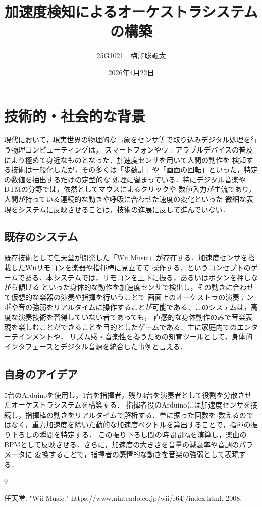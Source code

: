 \documentclass[uplatex,dvipdfmx]{jsarticle}
\begin{document}
\title{加速度検知によるオーケストラシステムの構築}
\author{25G1021　梅澤聡颯太}
\date{2026年4月22日}
\maketitle
\section{技術的・社会的な背景}

現代において，現実世界の物理的な事象をセンサ等で取り込みデジタル処理を行う物理コンピューティングは，
スマートフォンやウェアラブルデバイスの普及により極めて身近なものとなった．加速度センサを用いて人間の動作を
検知する技術は一般化したが，その多くは「歩数計」や「画面の回転」といった，特定の数値を抽出するだけの定型的な
処理に留まっている．特にデジタル音楽やDTMの分野では，依然としてマウスによるクリックや
数値入力が主流であり，人間が持っている連続的な動きや呼吸に合わせた速度の変化といった
微細な表現をシステムに反映させることは，技術の進展に反して進んでいない．

\subsection{既存のシステム}

既存技術として任天堂が開発した「Wii Music」が存在する．加速度センサを搭載したWiiリモコンを楽器や指揮棒に見立てて
操作する，というコンセプトのゲームである\cite{ref:wii}．本システムでは，リモコンを上下に振る，あるいはボタンを押しながら傾ける
といった身体的な動作を加速度センサで検出し，その動きに合わせて仮想的な楽器の演奏や指揮を行いうことで
画面上のオーケストラの演奏テンポや音の強弱をリアルタイムに操作することが可能である．このシステムは，高度な演奏技術を習得していない者であっても，
直感的な身体動作のみで音楽表現を楽しむことができることを目的としたゲームである．主に家庭内でのエンターテインメントや，
リズム感・音楽性を養うための知育ツールとして，身体的インタフェースとデジタル音源を統合した事例と言える．

\subsection{自身のアイデア}

5台のArduinoを使用し，1台を指揮者，残り4台を演奏者として役割を分散させたオーケストラシステムを構築する．
指揮者役のArduinoには加速度センサを接続し，指揮棒の動きをリアルタイムで解析する．単に振った回数を
数えるのではなく，重力加速度を除いた動的な加速度ベクトルを算出することで，指揮の振り下ろしの瞬間を特定する．
この振り下ろし間の時間間隔を演算し，楽曲のBPMとして反映させる．さらに，加速度の大きさを音量の減衰率や音調のパラメータに
変換することで，指揮者の感情的な動きを音楽の強弱として表現する．


\begin{thebibliography}{9}

  任天堂. "Wii Music." https://www.nintendo.co.jp/wii/r64j/index.html, 2008.

\end{thebibliography}
\end{document}
